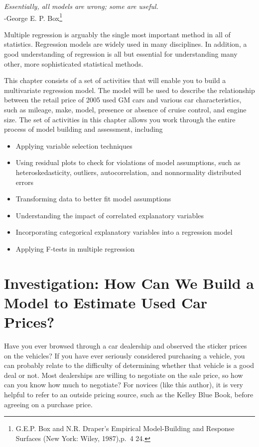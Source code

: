 \documentclass[
]{report}
\providecommand{\tightlist}{%
  \setlength{\itemsep}{0pt}\setlength{\parskip}{0pt}}
\begin{document}
\emph{Essentially, all models are wrong; some are useful.}\\
-George E. P. Box\footnote{G.E.P. Box and N.R. Draper's Empirical Model-Building and Response Surfaces (New York: Wiley, 1987),p.~4 24.}

Multiple regression is arguably the single most important method in all of statistics.
Regression models are widely used in many disciplines. In addition, a good understanding
of regression is all but essential for understanding many other, more sophisticated
statistical methods.

This chapter consists of a set of activities that will enable you to build a multivariate
regression model. The model will be used to describe the relationship between the retail price of 2005 used GM cars and various car characteristics, such as mileage, make, model, presence or absence of cruise control, and engine size. The set of activities in this chapter allows you work through the entire process of model building and assessment, including

\begin{itemize}
\tightlist
\item
  Applying variable selection techniques
\item
  Using residual plots to check for violations of model assumptions, such as heteroskedasticity, outliers, autocorrelation, and nonnormality distributed errors
\item
  Transforming data to better fit model assumptions
\item
  Understanding the impact of correlated explanatory variables
\item
  Incorporating categorical explanatory variables into a regression model
\item
  Applying F-tests in multiple regression
\end{itemize}

\newpage

\section{\texorpdfstring{\textbf{Investigation: How Can We Build a Model to Estimate Used Car Prices?}}{Investigation: How Can We Build a Model to Estimate Used Car Prices?}}\label{investigation-how-can-we-build-a-model-to-estimate-used-car-prices}

Have you ever browsed through a car dealership and observed the sticker prices on the vehicles? If you have ever seriously considered purchasing a vehicle, you can probably relate to the difficulty of determining whether that vehicle is a good deal or not. Most dealerships are willing to negotiate on the sale price, so how can you know how much to negotiate? For novices (like this author), it is very helpful to refer to an outside
pricing source, such as the Kelley Blue Book, before agreeing on a purchase price.
\end{document}
